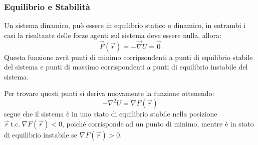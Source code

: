 \documentclass{article}
\numberwithin{equation}{subsection}
\begin{document}
\subsubsection{Equilibrio e Stabilità}
Un sistema dinamico, può essere in equilibrio statico o dinamico, 
in entrambi i casi la risultante delle forze agenti sul sistema 
deve essere nulla, allora:
\begin{equation*}
    \vec{F}(\vec{r})=-\vec{\nabla}U=\vec{0}
\end{equation*}
Questa funzione avrà punti di minimo corripsondenti a 
punti di equilibrio stabile del sistema e punti di massimo 
corrispondenti a punti di equilibrio instabile del sistema. 


Per trovare questi punti si deriva nuovamente la funzione 
ottenendo:
\begin{equation*}
    -\nabla^{2}U=\nabla F(\vec{r})
\end{equation*}
segue che il sistema è in uno stato di equilibrio stabile nella 
posizione $\vec{r}\:\mbox{t.c.}\:\nabla F(\vec{r})<0$, poiché 
corrisponde ad un punto di minimo, mentre è in stato di 
equilibrio instabile se $\nabla F(\vec{r})>0$.
\end{document}
